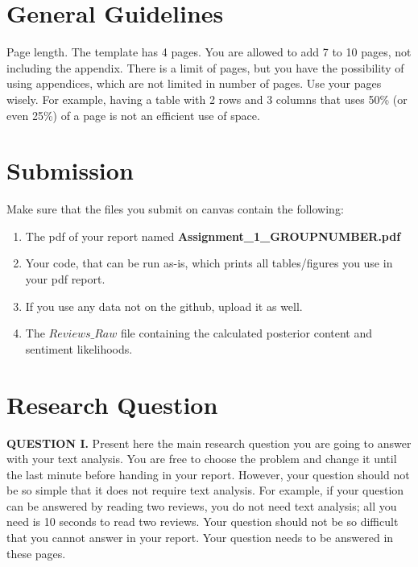 \documentclass[11pt]{article}
\newcommand{\question}[2]{%
  \par\medskip
  \noindent\textbf{QUESTION #1.} #2\par\medskip
}
\begin{document}
\section{General Guidelines}
Page length. The template has 4 pages. You are allowed to add 7 to 10 pages, not
including the appendix. There is a limit of pages, but you have the possibility of
using appendices, which are not limited in number of pages. Use your pages wisely.
For example, having a table with 2 rows and 3 columns that uses 50\% (or even 25\%)
of a page is not an efficient use of space.

\section{Submission}
Make sure that the files you submit on canvas contain the following:
\begin{enumerate}
    \item The pdf of your report named \textbf{Assignment\_1\_GROUPNUMBER.pdf}
    \item Your code, that can be run as-is, which prints all tables/figures you use in your pdf report.
    \item If you use any data not on the github, upload it as well.
    \item The $Reviews\_Raw$ file containing the calculated posterior content and sentiment likelihoods. 
\end{enumerate}



\section{Research Question}
\question{I}{Present here the main research question you are going to answer with
your text analysis. You are free to choose the problem and change it until the last
minute before handing in your report. However, your question should not be so simple
that it does not require text analysis. For example, if your question can be answered
by reading two reviews, you do not need text analysis; all you need is 10 seconds to
read two reviews. Your question should not be so difficult that you cannot answer in
your report. Your question needs to be answered in these pages.}
\end{document}
